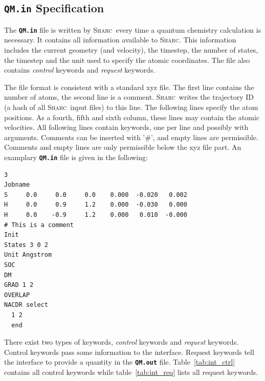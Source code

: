 \documentclass[a4paper,11pt,DIV=15,openany,twoside=false]{scrbook}
\newcommand{\sharc}{\textsc{Sharc}}
\newcommand{\ttt}[1]{\textbf{\texttt{#1}}}
\newenvironment{example}{
  \vspace{0mm}
  \definecolor{shadecolor}{HTML}{E4F4FF}
  \begin{shaded}
}{
  \end{shaded}
}
\begin{document}
\subsection{\ttt{QM.in} Specification}\label{intf:qmin}

The \ttt{QM.in} file is written by \sharc\ every time a quantum chemistry calculation is necessary. It contains all information available to \sharc. This information includes the current geometry (and velocity), the timestep, the number of states, the timestep and the unit used to specify the atomic coordinates. The file also contains \textit{control} keywords and \textit{request} keywords. 

The file format is consistent with a standard xyz file. The first line contains the number of atoms, the second line is a comment. \sharc\ writes the trajectory ID (a hash of all \sharc\ input files) to this line. The following lines specify the atom positions. As a fourth, fifth and sixth column, these lines may contain the atomic velocities.
All following lines contain keywords, one per line and possibly with arguments. Comments can be inserted with '\#', and empty lines are permissible. Comments and empty lines are only permissible below the xyz file part.
An examplary \ttt{QM.in} file is given in the following:
\begin{example}
  \begin{verbatim}
3
Jobname
S     0.0     0.0     0.0    0.000  -0.020   0.002
H     0.0     0.9     1.2    0.000  -0.030   0.000
H     0.0    -0.9     1.2    0.000   0.010  -0.000
# This is a comment
Init
States 3 0 2
Unit Angstrom
SOC
DM
GRAD 1 2
OVERLAP
NACDR select
  1 2
  end
  \end{verbatim}
\end{example}

There exist two types of keywords, \textit{control} keywords and \textit{request} keywords. Control keywords pass some information to the interface. Request keywords tell the interface to provide a quantity in the \ttt{QM.out} file. Table~\ref{tab:int_ctrl} contains all control keywords while table~\ref{tab:int_req} lists all request keywords.
\end{document}

